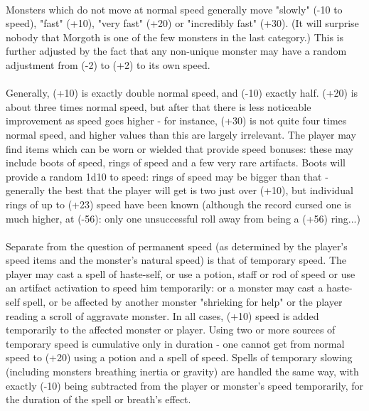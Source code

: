 \paragraph{}Monsters which do not move at normal speed generally move "slowly" (-10 to
speed), "fast" (+10), "very fast" (+20) or "incredibly fast" (+30). (It will
surprise nobody that Morgoth is one of the few monsters in the last category.)
This is further adjusted by the fact that any non-unique monster may
have a random adjustment from (-2) to (+2) to its own speed.

\paragraph{}Generally, (+10) is exactly double normal speed, and (-10) exactly half.
(+20) is about three times normal speed, but after that there is less
noticeable improvement as speed goes higher - for instance, (+30) is not
quite four times normal speed, and higher values than this are largely
irrelevant. The player may find items which can be worn or wielded that
provide speed bonuses: these may include boots of speed, rings of speed
and a few very rare artifacts. Boots will provide a random 1d10 to speed:
rings of speed may be bigger than that - generally the best that the player
will get is two just over (+10), but individual rings of up to (+23) speed
have been known (although the record cursed one is much higher, at (-56):
only one unsuccessful roll away from being a (+56) ring...)

\paragraph{}Separate from the question of permanent speed (as determined by the player's
speed items and the monster's natural speed) is that of temporary speed. The
player may cast a spell of haste-self, or use a potion, staff or rod of speed
or use an artifact activation to speed him temporarily: or a monster may cast
a haste-self spell, or be affected by another monster "shrieking for help"
or the player reading a scroll of aggravate monster. In all cases, (+10)
speed is added temporarily to the affected monster or player. Using two or
more sources of temporary speed is cumulative only in duration - one cannot
get from normal speed to (+20) using a potion and a spell of speed. Spells
of temporary slowing (including monsters breathing inertia or gravity) are
handled the same way, with exactly (-10) being subtracted from the player
or monster's speed temporarily, for the duration of the spell or breath's
effect.

